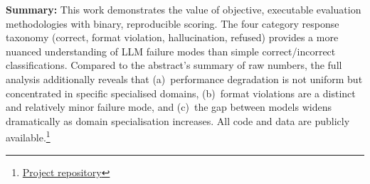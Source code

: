 \documentclass[12pt,a4paper]{article}
\begin{document}
\textbf{Summary:}
This work demonstrates the value of objective, executable evaluation methodologies with binary, reproducible scoring. The four category response taxonomy (correct, format violation, hallucination, refused) provides a more nuanced understanding of LLM failure modes than simple correct/incorrect classifications. Compared to the abstract's summary of raw numbers, the full analysis additionally reveals that (a)~performance degradation is not uniform but concentrated in specific specialised domains, (b)~format violations are a distinct and relatively minor failure mode, and (c)~the gap between models widens dramatically as domain specialisation increases. All code and data are publicly available.\footnote{\href{https://github.com/ArunGMR0411/ai-hallucination-eval}{Project repository}}

\newpage
{}


\end{document}
